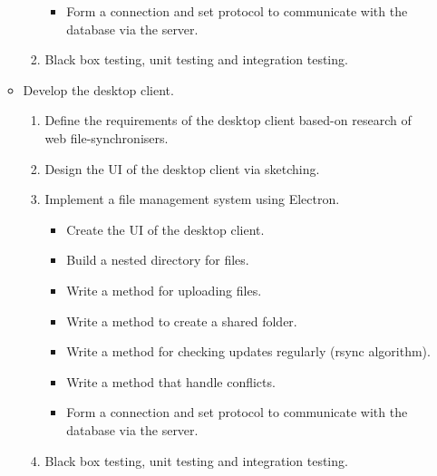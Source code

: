 \documentclass{article}
\begin{document}
\begin{enumerate}
\begin{itemize}
\begin{enumerate}
\begin{itemize}
				\item Form a connection and set protocol to communicate with the database via the server.
				\end{itemize}
			\item Black box testing, unit testing and integration testing.
			\end{enumerate}
		\item Develop the desktop client.
			\begin{enumerate}
			\item Define the requirements of the desktop client based-on research of web file-synchronisers.
			\item Design the UI of the desktop client via sketching.
			\item Implement a file management system using Electron.
				\begin{itemize}
				\item Create the UI of the desktop client.
				\item Build a nested directory for files.
				\item Write a method for uploading files.
				\item Write a method to create a shared folder.
				\item Write a method for checking updates regularly (rsync algorithm).
				\item Write a method that handle conflicts.
				\item Form a connection and set protocol to communicate with the database via the server.
				\end{itemize}
			\item Black box testing, unit testing and integration testing.
			\end{enumerate}
		\end{itemize}
	\end{enumerate}
	
\end{document}
